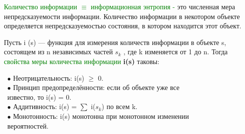\newpage
\rhead{\textbf{\textcolor{blue}{И}\textcolor{gray}{змерение количества информации}}}
\vspace*{2mm}
\newline
\textcolor{Green}{Количество информации $\equiv$ информационная энтропия -} это численная мера непредсказуемости информации. Количество информации в некотором объекте определяется непредсказуемостью состояния, в котором находится этот объект.
\vspace*{2mm}

Пусть i (s) — функция для измерения количеств информации в объекте s, состоящем из n
независимых частей $s_k$
, где k изменяется от 1 до n. Тогда \textcolor{Green}{свойства меры количества
информации} \textbf{i(s)} таковы:
\newline

\ $\bullet$ \quad Неотрицательность: i(s) $\geq$ 0.\\
\ $\bullet$ \quad Принцип предопределённости: если об объекте уже все\\
\ \qquad   известно, то i(s) = 0.\\
\ $\bullet$  \quad Аддитивность: i(s) = $\sum$ i($s_k$) по всем k.\\
\ $\bullet$  \quad Монотонность: i(s) монотонна при монотонном изменении \\
\ \qquad вероятностей.\\



